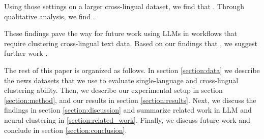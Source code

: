 
Using those settings on a larger cross-lingual dataset, we find that .
Through qualitative analysis, we find .


These findings pave the way for future work using LLMs in workflows that require clustering cross-lingual text data.
Based on our findings that , we suggest further work .

The rest of this paper is organized as follows.
In section \ref{section:data} we describe the news datasets that we use to evaluate single-language and cross-lingual clustering ability.
Then, we describe our experimental setup in section \ref{section:method}, and our results in section \ref{section:results}.
Next, we discuss the findings in section \ref{section:discussion} and summarize related work in LLM and neural clustering in \ref{section:related_work}.
Finally, we discuss future work and conclude in section \ref{section:conclusion}.